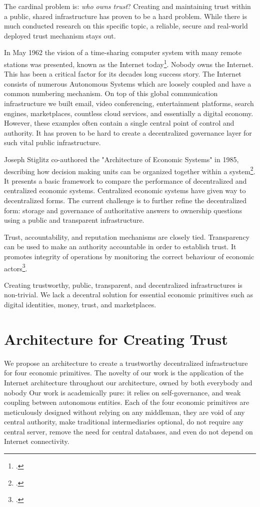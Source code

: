 \documentclass[USenglish]{article}
\begin{document}
The cardinal problem is: \emph{who owns trust}?
Creating and maintaining trust within a public, shared infrastructure has proven to be a hard problem.
While there is much conducted research on this specific topic, a reliable, secure and real-world deployed trust mechanism stays out.

In May 1962 the vision of a time-sharing computer system with many remote stations was presented, known as the Internet today\footcite{licklider1962line}.
Nobody owns the Internet.
This has been a critical factor for its decades long success story.
The Internet consists of numerous Autonomous Systems which are loosely coupled and have a common numbering mechanism.
On top of this global communication infrastructure we built email, video conferencing, entertainment platforms, search engines, marketplaces, countless cloud services, and essentially a digital economy.
However, these examples often contain a single central point of control and authority.
It has proven to be hard to create a decentralized governance layer for such vital public infrastructure.

Joseph Stiglitz co-authored the "Architecture of Economic Systems" in 1985, describing how decision making units can be organized together within a system\footcite{sah1985architecture}.
It presents a basic framework to compare the performance of decentralized and centralized economic systems.
Centralized economic systems have given way to decentralized forms.
The current challenge is to further refine the decentralized form: storage and governance of authoritative answers to ownership questions using a public and transparent infrastructure.

Trust, accountability, and reputation mechanisms are closely tied.
Transparency can be used to make an authority accountable in order to establish trust. 
It promotes integrity of operations by monitoring the correct behaviour of economic actors\footcite{troncoso2017systematizing}.

Creating trustworthy, public, transparent, and decentralized infrastructures is non-trivial.
We lack a decentral solution for essential economic primitives such as digital identities, money, trust, and marketplaces. 

\section{Architecture for Creating Trust}

We propose an architecture to create a trustworthy decentralized infrastructure for four economic primitives.
The novelty of our work is the application of the Internet architecture throughout our architecture, owned by both everybody and nobody
Our work is academically pure: it relies on self-governance, and weak coupling between autonomous entities. 
Each of the four economic primitives are meticulously designed without relying on any middleman, they are void of any central authority, make traditional intermediaries optional, do not require any central server, remove the need for central databases, and even do not depend on Internet connectivity.
\end{document}
